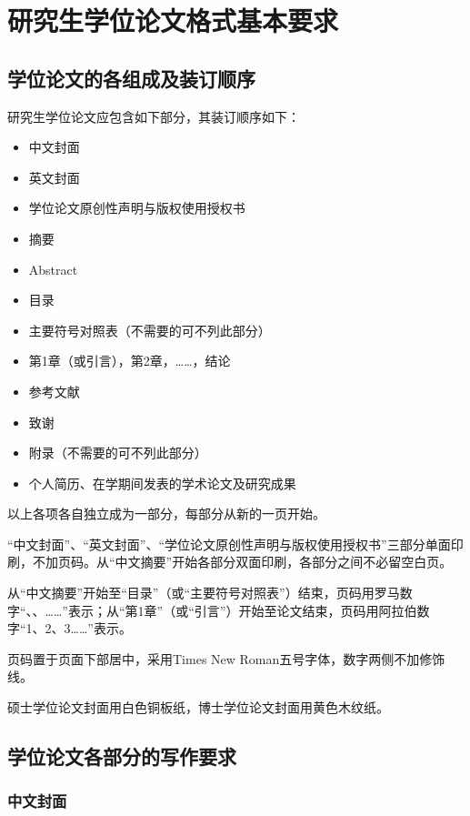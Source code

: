 \chapter{研究生学位论文格式基本要求}

\section{学位论文的各组成及装订顺序}

研究生学位论文应包含如下部分，其装订顺序如下：
\begin{itemize}
\setlength\itemsep{0pt}
  \item 中文封面
  \item 英文封面
  \item 学位论文原创性声明与版权使用授权书
  \item 摘要
  \item Abstract
  \item 目录
  \item 主要符号对照表（不需要的可不列此部分）
  \item 第1章（或引言），第2章，……，结论
  \item 参考文献
  \item 致谢
  \item 附录（不需要的可不列此部分）
  \item 个人简历、在学期间发表的学术论文及研究成果
\end{itemize}

以上各项各自独立成为一部分，每部分从新的一页开始。

“中文封面”、“英文封面”、“学位论文原创性声明与版权使用授权书”三部分单面印刷，不加页码。从“中文摘要”开始各部分双面印刷，各部分之间不必留空白页。

从“中文摘要”开始至“目录”（或“主要符号对照表”）结束，页码用罗马数字“、、……”表示；从“第1章”（或“引言”）开始至论文结束，页码用阿拉伯数字“1、2、3……”表示。

页码置于页面下部居中，采用Times New Roman五号字体，数字两侧不加修饰线。

硕士学位论文封面用白色铜板纸，博士学位论文封面用黄色木纹纸。

\section{学位论文各部分的写作要求}

\subsection{中文封面}

